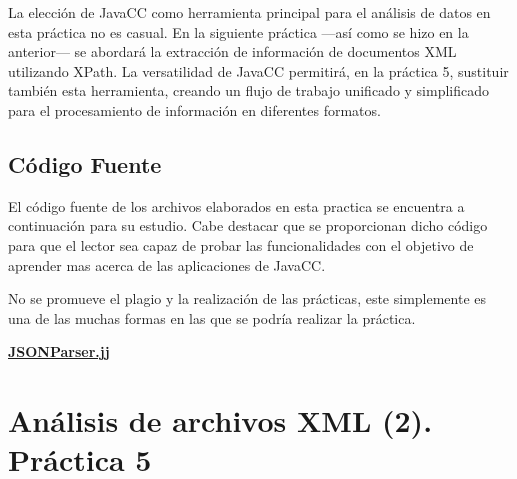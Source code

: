 

La elección de JavaCC como herramienta principal para el análisis de datos en esta práctica no es casual. En la siguiente práctica ---así como se hizo en la anterior--- se abordará la extracción de información de documentos XML utilizando XPath. La versatilidad de JavaCC permitirá, en la práctica 5, sustituir también esta herramienta, creando un flujo de trabajo unificado y simplificado para el procesamiento de información en diferentes formatos.

\subsection{Código Fuente}

\noindent El código fuente de los archivos elaborados en esta practica se encuentra a continuación para su estudio. Cabe destacar que se proporcionan dicho código para que el lector sea capaz de probar las funcionalidades con el objetivo de aprender mas acerca de las aplicaciones de JavaCC.

No se promueve el plagio y la realización de las prácticas, este simplemente es una de las muchas formas en las que se podría realizar la práctica.

\hyperref[sec:JSONParser]{\textbf{JSONParser.jj}}

\section{Análisis de archivos XML (2). Práctica 5}


